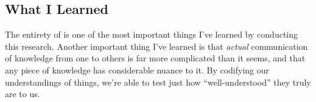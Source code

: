 \subsection{What I Learned}
\label{chap:conclusion:what-i-learned}

The entirety of  is one of the most important things I've
learned by conducting this research. Another important thing I've learned is
that \textit{actual} communication of knowledge from one to others is far more
complicated than it seems, and that any piece of knowledge has considerable
nuance to it. By codifying our understandings of things, we're able to test just
how ``well-understood'' \cite{well-understood} they truly are to us.
